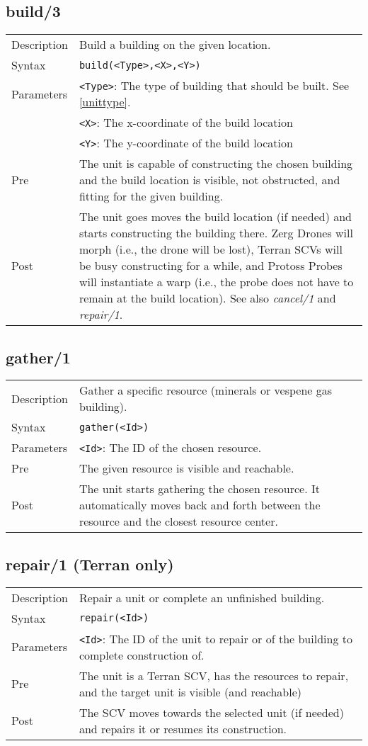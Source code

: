 \subsection{build/3}
\begin{tabularx}{\textwidth}{lX}
 Description & Build a building on the given location. \\
 Syntax & \verb|build(<Type>,<X>,<Y>)| \\
 Parameters & \verb|<Type>|: The type of building that should be built. See \ref{unittype}. \\
            & \verb|<X>|: The x-coordinate of the build location \\
            & \verb|<Y>|: The y-coordinate of the build location \\
 Pre & The unit is capable of constructing the chosen building and the build location is visible, not obstructed, and fitting for the given building. \\
 Post & The unit goes moves the build location (if needed) and starts constructing the building there. Zerg Drones will morph (i.e., the drone will be lost), Terran SCVs will be busy constructing for a while, and Protoss Probes will instantiate a warp (i.e., the probe does not have to remain at the build location). See also \textit{cancel/1} and \textit{repair/1}.
\end{tabularx}

\subsection{gather/1}
\begin{tabularx}{\textwidth}{lX}
 Description & Gather a specific resource (minerals or vespene gas building). \\
 Syntax & \verb|gather(<Id>)| \\
 Parameters & \verb|<Id>|: The ID of the chosen resource. \\
 Pre & The given resource is visible and reachable. \\
 Post & The unit starts gathering the chosen resource. It automatically moves back and forth between the resource and the closest resource center.
\end{tabularx}

\subsection{repair/1 (Terran only)}
\begin{tabularx}{\textwidth}{lX}
 Description & Repair a unit or complete an unfinished building. \\
 Syntax & \verb|repair(<Id>)| \\
 Parameters & \verb|<Id>|: The ID of the unit to repair or of the building to complete construction of. \\
 Pre & The unit is a Terran SCV, has the resources to repair, and the target unit is visible (and reachable) \\
 Post & The SCV moves towards the selected unit (if needed) and repairs it or resumes its construction.
\end{tabularx}
